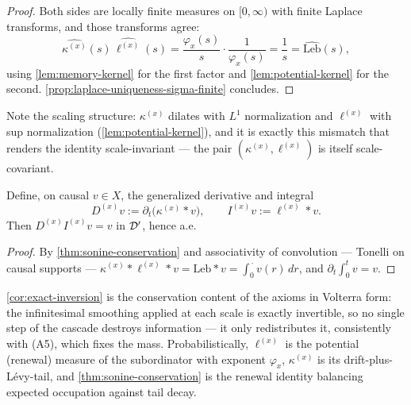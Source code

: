 \begin{proof}
\leanok
Both sides are locally finite measures on $[0,\infty)$ with finite Laplace transforms, and
those transforms agree:
\[
  \widehat{\kappa^{(x)}}(s)\,\widehat{\ell^{(x)}}(s)
  = \frac{\varphi_x(s)}{s}\cdot\frac{1}{\varphi_x(s)} = \frac{1}{s}
  = \widehat{\mathrm{Leb}}(s),
\]
using \ref{lem:memory-kernel} for the first factor and \ref{lem:potential-kernel} for the
second. \ref{prop:laplace-uniqueness-sigma-finite} concludes.
\end{proof}

\bigskip

Note the scaling structure: $\kappa^{(x)}$ dilates with $L^1$ normalization and $\ell^{(x)}$
with sup normalization (\ref{lem:potential-kernel}), and it is exactly this mismatch that
renders the identity scale-invariant --- the pair $(\kappa^{(x)}, \ell^{(x)})$ is itself
scale-covariant.

\begin{corollary}\label{cor:exact-inversion}
Define, on causal $v \in X$, the generalized derivative and integral
\[
  D^{(x)} v := \partial_t\bigl(\kappa^{(x)} * v\bigr), \qquad I^{(x)} v := \ell^{(x)} * v .
\]
Then $D^{(x)} I^{(x)} v = v$ in $\mathcal{D}'$, hence a.e.
\statusT
\end{corollary}

\begin{proof}
By \ref{thm:sonine-conservation} and associativity of convolution --- Tonelli on causal
supports --- $\kappa^{(x)} * \ell^{(x)} * v = \mathrm{Leb} * v = \int_0^{\,\cdot} v(r)\,dr$,
and $\partial_t \int_0^t v = v$.
\end{proof}

\bigskip

\ref{cor:exact-inversion} is the conservation content of the axioms in Volterra form: the
infinitesimal smoothing applied at each scale is exactly invertible, so no single step of the
cascade destroys information --- it only redistributes it, consistently with (A5), which fixes
the mass. Probabilistically, $\ell^{(x)}$ is the potential (renewal) measure of the
subordinator with exponent $\varphi_x$, $\kappa^{(x)}$ is its drift-plus-Lévy-tail, and
\ref{thm:sonine-conservation} is the renewal identity balancing expected occupation against
tail decay.

